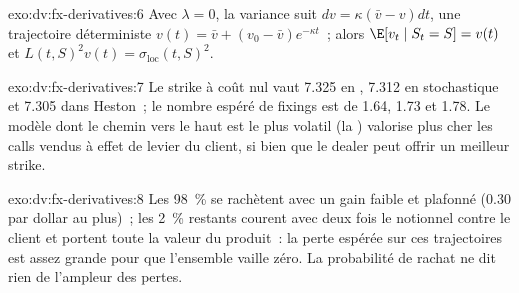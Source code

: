 \begin{solution}{exo:dv:fx-derivatives:6}
Avec $\lambda=0$, la variance suit $dv=\kappa(\bar v-v)dt$, une trajectoire déterministe $v(t)=\bar v+(v_0-\bar v)e^{-\kappa t}$~; alors
$\E[v_t\mid S_t=S]=v(t)$ et $L(t,S)^2v(t)=\sigma_{\mathrm{loc}}(t,S)^2$.
\end{solution}

\begin{solution}{exo:dv:fx-derivatives:7}
Le strike à coût nul vaut 7.325 en , 7.312 en  stochastique et 7.305 dans Heston~; le nombre espéré de fixings est de 1.64,
1.73 et 1.78. Le modèle dont le chemin vers le haut est le plus volatil (la ) valorise plus cher les calls vendus à effet de levier du client, si bien que le dealer
peut offrir un meilleur strike.
\end{solution}

\begin{solution}{exo:dv:fx-derivatives:8}
Les 98~\% se rachètent avec un gain faible et plafonné (0.30 par dollar au plus)~; les 2~\% restants courent avec deux fois le notionnel contre le client et portent toute la
valeur du produit~: la perte espérée sur ces trajectoires est assez grande pour que l'ensemble vaille zéro. La probabilité de rachat ne dit rien de l'ampleur des pertes.
\end{solution}


